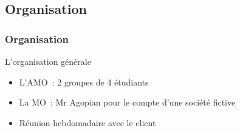 \subsection{Organisation}

\begin{frame}
	\frametitle{Organisation}
	\begin{block}{L'organisation générale}
		\begin{itemize}
			\item L'AMO~: 2 groupes de 4 étudiants
			\item La MO~: Mr Agopian pour le compte d'une société fictive \mo
			\item Réunion hebdomadaire avec le client
		\end{itemize}
	\end{block}
\end{frame}

